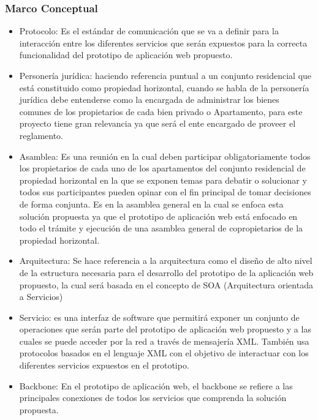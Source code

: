 \newpage

\subsubsection{Marco Conceptual}
\begin{itemize}
	
\item Protocolo: Es el estándar de comunicación que se va a definir para la interacción entre los diferentes servicios que serán expuestos para la correcta funcionalidad del prototipo de aplicación web propuesto.

\item Personería jurídica: haciendo referencia puntual a un conjunto residencial que está constituido como propiedad horizontal, cuando se habla de la personería jurídica debe entenderse como la encargada de administrar los bienes comunes de los propietarios de cada bien privado o Apartamento, para este proyecto tiene gran relevancia ya que será el ente encargado de proveer el reglamento.
  
\item Asamblea: Es una reunión en la cual deben participar obligatoriamente todos los propietarios de cada uno de los apartamentos del conjunto residencial de propiedad horizontal en la que se exponen temas para debatir o solucionar y todos sus participantes pueden opinar con el fin principal de tomar decisiones de forma conjunta. Es en la asamblea general en la cual se enfoca esta solución propuesta ya que el prototipo de aplicación web está enfocado en todo el trámite y ejecución de una asamblea general de copropietarios de la propiedad horizontal.

\item Arquitectura: Se hace referencia a la arquitectura como el diseño de alto nivel de la estructura necesaria para el desarrollo del prototipo de la aplicación web propuesto, la cual será basada en el concepto de SOA (Arquitectura orientada a Servicios)

\item Servicio: es una interfaz de software que  permitirá exponer un conjunto de operaciones que serán parte del prototipo de aplicación web propuesto y a las cuales se puede acceder por la red a través de mensajería XML. También usa protocolos basados en el lenguaje XML con el objetivo de interactuar con los diferentes servicios expuestos en el prototipo.

\item Backbone: En el prototipo de aplicación web, el backbone  se refiere a las principales conexiones de todos los servicios que comprenda la solución propuesta.


\end{itemize}

